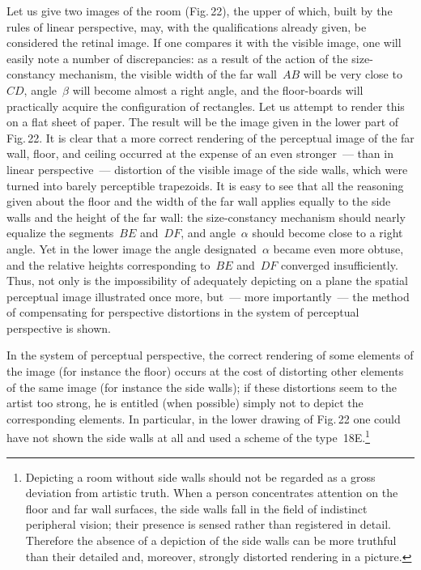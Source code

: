 Let us give two images of the room (Fig.\,22), the upper of which, built by the rules of
linear perspective, may, with the qualifications already given, be considered the retinal
image.  If one compares it with the visible image, one will easily note a number of
discrepancies: as a result of the action of the size-constancy mechanism, the visible
width of the far wall~$AB$ will be very close to~$CD$, angle~$\beta$ will become
almost a right angle, and the floor-boards will practically acquire the configuration of
rectangles.  Let us attempt to render this on a flat sheet of paper.  The result will be
the image given in the lower part of Fig.\,22.  It is clear that a more correct rendering
of the perceptual image of the far wall, floor, and ceiling occurred at the expense of an
even stronger~--- than in linear perspective~--- distortion of the visible image of the side
walls, which were turned into barely perceptible trapezoids.  It is easy to see that all
the reasoning given about the floor and the width of the far wall applies equally to the
side walls and the height of the far wall: the size-constancy mechanism should nearly
equalize the segments~$BE$ and~$DF$, and angle~$\alpha$ should become close to a
right angle.  Yet in the lower image the angle designated~$\alpha$ became even more
obtuse, and the relative heights corresponding to~$BE$ and~$DF$ converged
insufficiently.  Thus, not only is the impossibility of adequately depicting on a plane the
spatial perceptual image illustrated once more, but~--- more importantly~--- the method
of compensating for perspective distortions in the system of perceptual perspective is
shown.



In the system of perceptual perspective, the correct rendering of some elements of the
image (for instance the floor) occurs at the cost of distorting other elements of the same
image (for instance the side walls); if these distortions seem to the artist too strong,
he is entitled (when possible) simply not to depict the corresponding elements.  In
particular, in the lower drawing of Fig.\,22 one could have not shown the side walls at
all and used a scheme of the type~18E.\footnote{%
  Depicting a room without side walls should not be regarded as a gross deviation
  from artistic truth.  When a person concentrates attention on the floor and far wall
  surfaces, the side walls fall in the field of indistinct peripheral vision; their presence
  is sensed rather than registered in detail.  Therefore the absence of a depiction of
  the side walls can be more truthful than their detailed and, moreover, strongly
  distorted rendering in a picture.}

